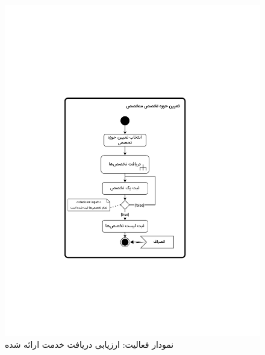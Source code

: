 \begin{figure}[ht!]
	\centering
	\includegraphics[scale=0.8, page=7]{figs/OOD-activity21-30.pdf}
	\caption{نمودار فعالیت: ارزیابی دریافت خدمت ارائه شده}
\end{figure}
\FloatBarrier
\newpage

